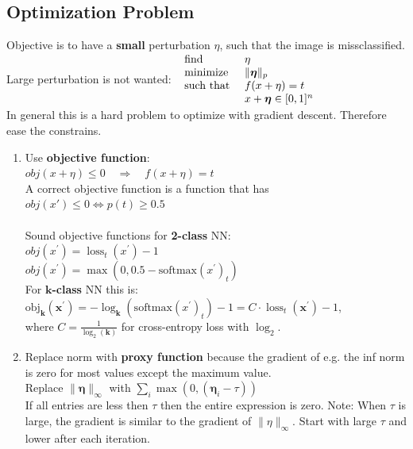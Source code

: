 \documentclass[11pt]{extarticle}
\begin{document}
\begin{multicols*}{3}
            \subsection*{Optimization Problem}
            Objective is to have a \textbf{small} perturbation $\eta$, such that the image is missclassified. Large perturbation is not wanted:
            $\begin{array} { l l } { \text { find } } & { \eta } \\ { \text { minimize } } & { \| \boldsymbol { \eta } \| _ { p } } \\ { \text { such that } } & { f ( x + \eta ) = t } \\ { } & { x + \boldsymbol { \eta } \in [ 0,1 ] ^ { n } } \end{array}$\\
            In general this is a hard problem to optimize with gradient descent. Therefore ease the constrains.
            \begin{enumerate}[leftmargin=*]
            \item
            Use \textbf{objective function}:\\
            $o b j ( x + \eta ) \leq 0\quad \Rightarrow \quad f ( x + \eta ) = t$\\
            A correct objective function is a function that has
            $o b j ( x') \leq 0 \iff p(t) \geq 0.5$\\
            \\
            Sound objective functions for \textbf{2-class} NN:\\
            $o b j \left( x ^ { \prime } \right) = \operatorname { loss } _ { t } \left( x ^ { \prime } \right) - 1$\\
            $o b j \left( x ^ { \prime } \right) = \max \left( 0,0.5 - \text{softmax}\left(x ^ { \prime }\right) _ { t } \right)$\\
            For \textbf{$\mathbf{k}$-class} NN this is:\\
            $\mathrm { obj } _ {\boldsymbol{k} }(\boldsymbol{x}^ \prime)  = - \log _ {\mathbf{k}} \left( \text{softmax}\left(x ^ { \prime }\right) _ { t } \right) - 1 = C \cdot \operatorname { loss } _ { t } \left( \boldsymbol { x } ^ { \prime } \right) - 1$,\\
            where $C = \frac { 1 } { \log _ { 2 } ( \boldsymbol{k} ) }$ for cross-entropy loss with $\log _ { 2 }$.
            
            \item
            Replace norm with \textbf{proxy function} because the gradient of e.g. the inf norm is zero for most values except the maximum value.\\
            Replace $\| \boldsymbol { \eta } \| _ { \infty }$ with $\sum _ { i } \max \left( 0 , \left( \boldsymbol { \eta } _ { i } - \tau \right) \right)$\\
            If all entries are less then $\tau$ then the entire expression is zero.
            Note: When $\tau$ is large, the gradient is similar to the gradient of $\| \eta \| _ { \infty }$.
            Start with large $\tau$ and lower after each iteration.
            

\end{enumerate}
\end{multicols*}
\end{document}

